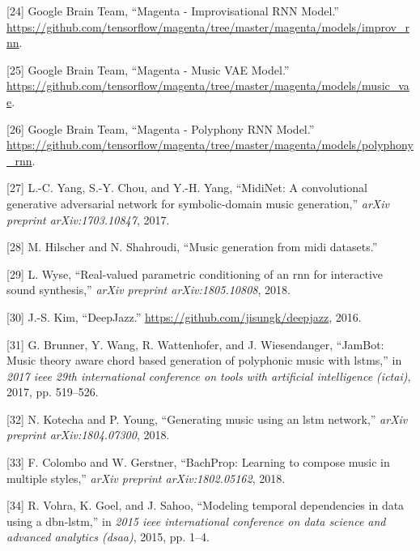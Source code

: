 \documentclass[12pt,]{article}
\begin{document}
\leavevmode\hypertarget{ref-magentaimprov}{}%
{[}24{]} \relax Google Brain Team, ``Magenta - Improvisational RNN
Model.'' \\
\url{https://github.com/tensorflow/magenta/tree/master/magenta/models/improv_rnn}.

\leavevmode\hypertarget{ref-magentavae}{}%
{[}25{]} \relax Google Brain Team, ``Magenta - Music VAE Model.'' \\
\url{https://github.com/tensorflow/magenta/tree/master/magenta/models/music_vae}.

\leavevmode\hypertarget{ref-magentapolyphony}{}%
{[}26{]} \relax Google Brain Team, ``Magenta - Polyphony RNN Model.'' \\
\url{https://github.com/tensorflow/magenta/tree/master/magenta/models/polyphony_rnn}.

\leavevmode\hypertarget{ref-yang2017midinet}{}%
{[}27{]} L.-C. Yang, S.-Y. Chou, and Y.-H. Yang, ``MidiNet: A
convolutional generative adversarial network for symbolic-domain music
generation,'' \emph{arXiv preprint arXiv:1703.10847}, 2017.

\leavevmode\hypertarget{ref-hilschermusic}{}%
{[}28{]} M. Hilscher and N. Shahroudi, ``Music generation from midi
datasets.''

\leavevmode\hypertarget{ref-wyse2018real}{}%
{[}29{]} L. Wyse, ``Real-valued parametric conditioning of an rnn for
interactive sound synthesis,'' \emph{arXiv preprint arXiv:1805.10808},
2018.

\leavevmode\hypertarget{ref-kim2016deepjazz}{}%
{[}30{]} J.-S. Kim, ``DeepJazz.''
\url{https://github.com/jisungk/deepjazz}, 2016.

\leavevmode\hypertarget{ref-brunner2017jambot}{}%
{[}31{]} G. Brunner, Y. Wang, R. Wattenhofer, and J. Wiesendanger,
``JamBot: Music theory aware chord based generation of polyphonic music
with lstms,'' in \emph{2017 ieee 29th international conference on tools
with artificial intelligence (ictai)}, 2017, pp. 519--526.

\leavevmode\hypertarget{ref-kotecha2018generating}{}%
{[}32{]} N. Kotecha and P. Young, ``Generating music using an lstm
network,'' \emph{arXiv preprint arXiv:1804.07300}, 2018.

\leavevmode\hypertarget{ref-colombo2018bachprop}{}%
{[}33{]} F. Colombo and W. Gerstner, ``BachProp: Learning to compose
music in multiple styles,'' \emph{arXiv preprint arXiv:1802.05162},
2018.

\leavevmode\hypertarget{ref-vohra2015modeling}{}%
{[}34{]} R. Vohra, K. Goel, and J. Sahoo, ``Modeling temporal
dependencies in data using a dbn-lstm,'' in \emph{2015 ieee
international conference on data science and advanced analytics (dsaa)},
2015, pp. 1--4.
\end{document}
